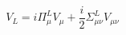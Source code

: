 \begin{equation} 
V_{L} = i \Pi_{\mu}^{L} V_{\mu} + \frac{i}{2} \Sigma_{\mu \nu}^{L} V_{\mu \nu}  
\end{equation} 
